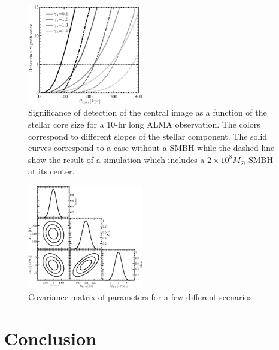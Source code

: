 \documentclass[chicago]{emulateapj}
\begin{document}
\begin{figure}
\begin{center}
\centering
\includegraphics[trim= 0 0 0 0, width=0.45\textwidth]{figures/f_03.eps}
\centering
\end{center}
\caption{ Significance of detection of the central image as a function of the stellar core size for a 10-hr long ALMA observation. The colors correspond to different slopes of the stellar component. The solid curves correspond to a case without a SMBH while the dashed line show the result of a simulation which includes a $2\times10^8M_{\odot}$ SMBH at its center.
\label{f:f2}}
\end{figure}


\begin{figure}
\begin{center}
\centering
\includegraphics[trim= 0 0 0 0, width=0.45\textwidth]{figures/f_04.eps}
\centering
\end{center}
\caption{ Covariance matrix of parameters for a few different scenarios.
\label{f:f2}}
\end{figure}



\section{Conclusion}

\acknowledgements{
}



\end{document}
